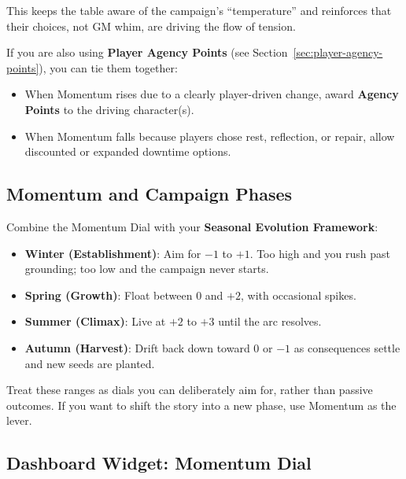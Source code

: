 \documentclass[11pt]{article}
\begin{document}
This keeps the table aware of the campaign's ``temperature'' and reinforces that their choices, not GM whim, are driving the flow of tension.

If you are also using \textbf{Player Agency Points} (see Section~\ref{sec:player-agency-points}), you can tie them together:

\begin{itemize}
  \item When Momentum rises due to a clearly player-driven change, award \textbf{Agency Points} to the driving character(s).
  \item When Momentum falls because players chose rest, reflection, or repair, allow discounted or expanded downtime options.
\end{itemize}

\subsection{Momentum and Campaign Phases}

Combine the Momentum Dial with your \textbf{Seasonal Evolution Framework}:

\begin{itemize}
  \item \textbf{Winter (Establishment)}: Aim for $-1$ to $+1$. Too high and you rush past grounding; too low and the campaign never starts.
  \item \textbf{Spring (Growth)}: Float between $0$ and $+2$, with occasional spikes.
  \item \textbf{Summer (Climax)}: Live at $+2$ to $+3$ until the arc resolves.
  \item \textbf{Autumn (Harvest)}: Drift back down toward $0$ or $-1$ as consequences settle and new seeds are planted.
\end{itemize}

Treat these ranges as dials you can deliberately aim for, rather than passive outcomes. If you want to shift the story into a new phase, use Momentum as the lever.

\subsection{Dashboard Widget: Momentum Dial}
\label{sec:dashboard-momentum-widget}
\end{document}
